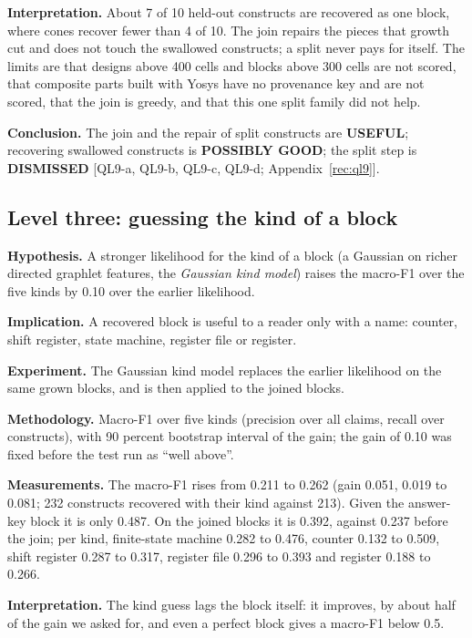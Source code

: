 \documentclass[conference]{IEEEtran}
\newcommand{\verdict}[1]{\textbf{\textsc{#1}}}
\newcommand{\hev}[1]{\par\smallskip\noindent\textbf{#1}}
\begin{document}
\hev{Interpretation.} About 7 of 10 held-out constructs are recovered as one block, where cones recover fewer than 4 of 10. The join repairs the pieces that growth cut and does not touch the swallowed constructs; a split never pays for itself. The limits are that designs above 400 cells and blocks above 300 cells are not scored, that composite parts built with Yosys have no provenance key and are not scored, that the join is greedy, and that this one split family did not help.

\hev{Conclusion.} The join and the repair of split constructs are \verdict{USEFUL}; recovering swallowed constructs is \verdict{POSSIBLY GOOD}; the split step is \verdict{DISMISSED} [QL9-a, QL9-b, QL9-c, QL9-d; Appendix~\ref{rec:ql9}].

\subsection{Level three: guessing the kind of a block}
\label{arg:ra13}

\hev{Hypothesis.} A stronger likelihood for the kind of a block (a Gaussian on richer directed graphlet features, the \emph{Gaussian kind model}) raises the macro-F1 over the five kinds by 0.10 over the earlier likelihood.

\hev{Implication.} A recovered block is useful to a reader only with a name: counter, shift register, state machine, register file or register.

\hev{Experiment.} The Gaussian kind model replaces the earlier likelihood on the same grown blocks, and is then applied to the joined blocks.

\hev{Methodology.} Macro-F1 over five kinds (precision over all claims, recall over constructs), with 90 percent bootstrap interval of the gain; the gain of 0.10 was fixed before the test run as ``well above''.

\hev{Measurements.} The macro-F1 rises from 0.211 to 0.262 (gain 0.051, 0.019 to 0.081; 232 constructs recovered with their kind against 213). Given the answer-key block it is only 0.487. On the joined blocks it is 0.392, against 0.237 before the join; per kind, finite-state machine 0.282 to 0.476, counter 0.132 to 0.509, shift register 0.287 to 0.317, register file 0.296 to 0.393 and register 0.188 to 0.266.

\hev{Interpretation.} The kind guess lags the block itself: it improves, by about half of the gain we asked for, and even a perfect block gives a macro-F1 below 0.5.
\end{document}

